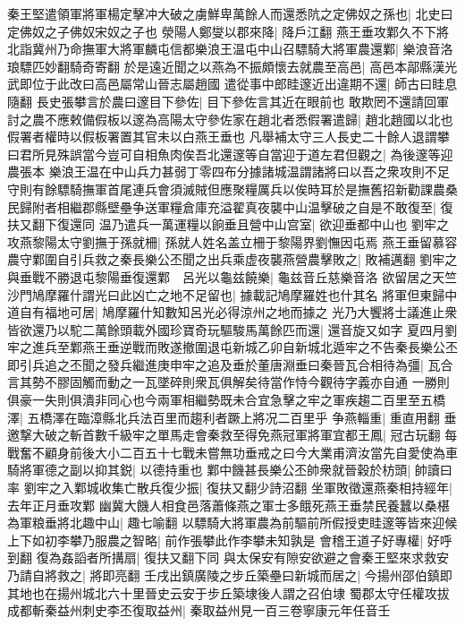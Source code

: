 秦王堅遣領軍將軍楊定擊冲大破之虜鮮卑萬餘人而還悉阬之定佛奴之孫也|{
	北史曰定佛奴之子佛奴宋奴之子也}
滎陽人鄭燮以郡來降|{
	降戶江翻}
燕王垂攻鄴久不下將北詣冀州乃命撫軍大將軍麟屯信都樂浪王温屯中山召驃騎大將軍農還鄴|{
	樂浪音洛琅驃匹妙翻騎奇寄翻}
於是遠近聞之以燕為不振頗懷去就農至高邑|{
	高邑本鄗縣漢光武即位于此改曰高邑屬常山晉志屬趙國}
遣從事中郎眭邃近出違期不還|{
	師古曰眭息隨翻}
長史張攀言於農曰邃目下參佐|{
	目下參佐言其近在眼前也}
敢欺罔不還請回軍討之農不應敕備假板以邃為高陽太守參佐家在趙北者悉假署遣歸|{
	趙北趙國以北也假署者權時以假板署置其官未以白燕王垂也}
凡舉補太守三人長史二十餘人退謂攀曰君所見殊誤當今豈可自相魚肉俟吾北還邃等自當迎于道左君但觀之|{
	為後邃等迎農張本}
樂浪王温在中山兵力甚弱丁零四布分據諸城温謂諸將曰以吾之衆攻則不足守則有餘驃騎撫軍首尾連兵會須滅賊但應聚糧厲兵以俟時耳於是撫舊招新勸課農桑民歸附者相繼郡縣壁壘争送軍糧倉庫充溢翟真夜襲中山温擊破之自是不敢復至|{
	復扶又翻下復還同}
温乃遣兵一萬運糧以餉垂且營中山宫室|{
	欲迎垂都中山也}
劉牢之攻燕黎陽太守劉撫于孫就柵|{
	孫就人姓名盖立柵于黎陽界劉憮因屯焉}
燕王垂留慕容農守鄴圍自引兵救之秦長樂公丕聞之出兵乘虚夜襲燕營農擊敗之|{
	敗補邁翻}
劉牢之與垂戰不勝退屯黎陽垂復還鄴　呂光以龜兹饒樂|{
	龜兹音丘慈樂音洛}
欲留居之天竺沙門鳩摩羅什謂光曰此凶亡之地不足留也|{
	據載記鳩摩羅姓也什其名}
將軍但東歸中道自有福地可居|{
	鳩摩羅什知數知呂光必得涼州之地而據之}
光乃大饗將士議進止衆皆欲還乃以駝二萬餘頭載外國珍寶奇玩驅駿馬萬餘匹而還|{
	還音旋又如字}
夏四月劉牢之進兵至鄴燕王垂逆戰而敗遂撤圍退屯新城乙卯自新城北遁牢之不告秦長樂公丕即引兵追之丕聞之發兵繼進庚申牢之追及垂於董唐淵垂曰秦晉瓦合相待為彊|{
	瓦合言其勢不膠固觸而動之一瓦墜碎則衆瓦俱解矣待當作恃今觀待字義亦自通}
一勝則俱豪一失則俱潰非同心也今兩軍相繼勢既未合宜急擊之牢之軍疾趨二百里至五橋澤|{
	五橋澤在臨漳縣北兵法百里而趨利者蹶上將况二百里乎}
争燕輜重|{
	重直用翻}
垂邀撃大破之斬首數千級牢之單馬走會秦救至得免燕冠軍將軍宜都王鳳|{
	冠古玩翻}
每戰奮不顧身前後大小二百五十七戰未嘗無功垂戒之曰今大業甫濟汝當先自愛使為車騎將軍德之副以抑其鋭|{
	以德持重也}
鄴中饑甚長樂公丕帥衆就晉穀於枋頭|{
	帥讀曰率}
劉牢之入鄴城收集亡散兵復少振|{
	復扶又翻少詩沼翻}
坐軍敗徵還燕秦相持經年|{
	去年正月垂攻鄴}
幽冀大饑人相食邑落蕭條燕之軍士多餓死燕王垂禁民養蠶以桑椹為軍粮垂將北趣中山|{
	趣七喻翻}
以驃騎大將軍農為前驅前所假授吏眭邃等皆來迎候上下如初李攀乃服農之智略|{
	前作張攀此作李攀未知孰是}
會稽王道子好專權|{
	好呼到翻}
復為姦謟者所搆扇|{
	復扶又翻下同}
與太保安有隙安欲避之會秦王堅來求救安乃請自將救之|{
	將即亮翻}
壬戌出鎮廣陵之步丘築壘曰新城而居之|{
	今揚州邵伯鎮即其地也在揚州城北六十里晉史云安于步丘築埭後人謂之召伯埭}
蜀郡太守任權攻拔成都斬秦益州刺史李丕復取益州|{
	秦取益州見一百三卷寧康元年任音壬}
